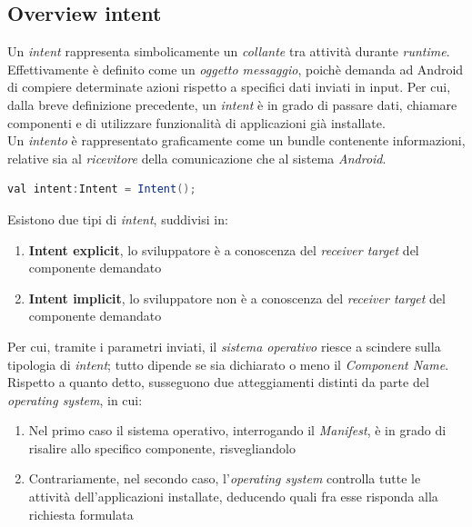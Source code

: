 \documentclass{article}
\begin{document}
\subsection*{Overview intent}
Un \textit{intent} rappresenta simbolicamente un \textit{collante} tra attività durante \textit{runtime}. Effettivamente è definito come un \textit{oggetto messaggio}, poichè demanda ad Android di compiere determinate azioni rispetto a specifici dati inviati in input. Per cui, dalla breve definizione precedente, un \textit{intent} è in grado di passare dati, chiamare componenti e di utilizzare funzionalità di applicazioni già installate.\vspace*{7pt}\\
Un \textit{intento} è rappresentato graficamente come un bundle contenente informazioni, relative sia al \textit{ricevitore} della comunicazione che al sistema \textit{Android}.
\begin{lstlisting}[language=JAVA, title=Inizializzazione di un intent]
val intent:Intent = Intent();
\end{lstlisting}
Esistono due tipi di \textit{intent}, suddivisi in:
\begin{enumerate}
    \itemsep0em
    \renewcommand*{\labelenumi}{-}
    \item \textbf{Intent explicit}, lo sviluppatore è a conoscenza del \textit{receiver target} del componente demandato
    \item \textbf{Intent implicit}, lo sviluppatore non è a conoscenza del \textit{receiver target} del componente demandato
\end{enumerate}
Per cui, tramite i parametri inviati, il \textit{sistema operativo} riesce a scindere sulla tipologia di \textit{intent}; tutto dipende se sia dichiarato o meno il \textit{Component Name}. Rispetto a quanto detto, susseguono due atteggiamenti distinti da parte del \textit{operating system}, in cui:
\begin{enumerate}
    \itemsep0em
    \renewcommand*{\labelenumi}{-}
    \item Nel primo caso il sistema operativo, interrogando il \textit{Manifest}, è in grado di risalire allo specifico componente, risvegliandolo
    \item Contrariamente, nel secondo caso, l'\textit{operating system} controlla tutte le attività dell'applicazioni installate, deducendo quali fra esse risponda alla richiesta formulata
\end{enumerate}
\end{document}
